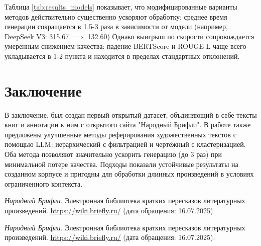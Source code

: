 \documentclass{article}
\theoremstyle{definition}
\theoremstyle{plain}
\begin{document}
Таблица \ref{tab:results_models} показывает, что модифицированные варианты методов действительно существенно ускоряют обработку: среднее время генерации сокращается в 1.5-3 раза в зависимости от модели (например, DeepSeek V3: 315.67 $\implies$ 132.60)
Однако выигрыш по скорости сопровождается умеренным снижением качества: падение BERTScore и ROUGE-L чаще всего укладывается в 1-2 пункта и находится в пределах стандартных отклонений.
\FloatBarrier
\section*{Заключение}
В заключение, был создан первый открытый датасет, объдиняющий в себе тексты книг и аннотации к ним с открытого сайта "Народный Брифли".
В работе также предложены улучшенные методы реферирования художественных текстов с помощью LLM: 
иерархический с фильтрацией и чертёжный с кластеризацией.
Оба метода позволяют значительно ускорить генерацию (до 3 раз) при минимальной потере качества. 
Подходы показали устойчивые результаты на созданном корпусе и пригодны для обработки длинных произведений в условиях ограниченного контекста.


\begin{thebibliography}{99}
\textit{Народный Брифли.}  
Электронная библиотека кратких пересказов литературных произведений.  
\url{https://wiki.briefly.ru/} (дата обращения: 16.07.2025).

\end{thebibliography}

\renewcommand\refname{References}


\begin{thebibliography}{99}
\textit{Народный Брифли.}  
Электронная библиотека кратких пересказов литературных произведений.  
\url{https://wiki.briefly.ru/} (дата обращения: 16.07.2025).

\end{thebibliography}
\end{document}
